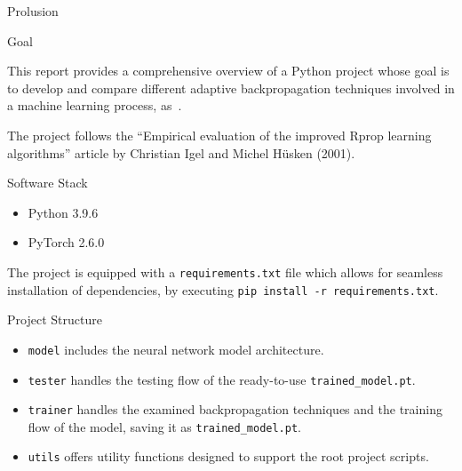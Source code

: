 \begin{chapter}{Prolusion}
    \begin{section}{Goal}
        \par This report provides a comprehensive overview of a Python project whose goal is to develop and compare different adaptive backpropagation techniques involved in a machine learning process, as~.
		\par The project follows the ``Empirical evaluation of the improved Rprop learning algorithms'' article by Christian Igel and Michel Hüsken (2001).
    \end{section}
    \newpage
	\begin{section}{Software Stack}
		\begin{itemize}
			\item Python 3.9.6
			\item PyTorch 2.6.0
		\end{itemize}
		The project is equipped with a \texttt{requirements.txt} file which allows for seamless installation of dependencies, by executing \texttt{pip install -r requirements.txt}.
	\end{section}
	\newpage
	\begin{section}{Project Structure}
		\medskip
		\begin{itemize}
			\item \texttt{model} includes the neural network model architecture.
			\item \texttt{tester} handles the testing flow of the ready-to-use \texttt{trained\_model.pt}.
			\item \texttt{trainer} handles the examined backpropagation techniques and the training flow of the model, saving it as \texttt{trained\_model.pt}.
			\item \texttt{utils} offers utility functions designed to support the root project scripts.
		\end{itemize}
	\end{section}
		\begin{comment}
			\begin{figure}[ht]
				\centering
				
				\caption{\emph{True inkscapelatex option}}
				\label{fig:latexembedded}
			\end{figure}
		\end{comment}
\end{chapter}